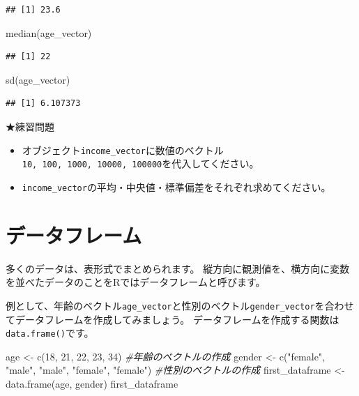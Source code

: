 \documentclass[
]{book}
\newenvironment{Shaded}{\begin{snugshade}}{\end{snugshade}}
\newcommand{\CommentTok}[1]{\textcolor[rgb]{0.56,0.35,0.01}{\textit{#1}}}
\newcommand{\DecValTok}[1]{\textcolor[rgb]{0.00,0.00,0.81}{#1}}
\newcommand{\FunctionTok}[1]{\textcolor[rgb]{0.00,0.00,0.00}{#1}}
\newcommand{\NormalTok}[1]{#1}
\newcommand{\OtherTok}[1]{\textcolor[rgb]{0.56,0.35,0.01}{#1}}
\newcommand{\StringTok}[1]{\textcolor[rgb]{0.31,0.60,0.02}{#1}}
\providecommand{\tightlist}{%
  \setlength{\itemsep}{0pt}\setlength{\parskip}{0pt}}
\begin{document}
\begin{verbatim}
## [1] 23.6
\end{verbatim}

\begin{Shaded}
\begin{Highlighting}[]
\FunctionTok{median}\NormalTok{(age\_vector)}
\end{Highlighting}
\end{Shaded}

\begin{verbatim}
## [1] 22
\end{verbatim}

\begin{Shaded}
\begin{Highlighting}[]
\FunctionTok{sd}\NormalTok{(age\_vector)}
\end{Highlighting}
\end{Shaded}

\begin{verbatim}
## [1] 6.107373
\end{verbatim}

★練習問題

\begin{itemize}
\tightlist
\item
  オブジェクト\texttt{income\_vector}に数値のベクトル\texttt{10,\ 100,\ 1000,\ 10000,\ 100000}を代入してください。
\item
  \texttt{income\_vector}の平均・中央値・標準偏差をそれぞれ求めてください。
\end{itemize}

\hypertarget{ux30c7ux30fcux30bfux30d5ux30ecux30fcux30e0}{%
\section{データフレーム}\label{ux30c7ux30fcux30bfux30d5ux30ecux30fcux30e0}}

多くのデータは、表形式でまとめられます。
縦方向に観測値を、横方向に変数を並べたデータのことをRではデータフレームと呼びます。

例として、年齢のベクトル\texttt{age\_vector}と性別のベクトル\texttt{gender\_vector}を合わせてデータフレームを作成してみましょう。
データフレームを作成する関数は\texttt{data.frame()}です。

\begin{Shaded}
\begin{Highlighting}[]
\NormalTok{age }\OtherTok{\textless{}{-}} \FunctionTok{c}\NormalTok{(}\DecValTok{18}\NormalTok{, }\DecValTok{21}\NormalTok{, }\DecValTok{22}\NormalTok{, }\DecValTok{23}\NormalTok{, }\DecValTok{34}\NormalTok{) }\CommentTok{\#年齢のベクトルの作成}
\NormalTok{gender }\OtherTok{\textless{}{-}} \FunctionTok{c}\NormalTok{(}\StringTok{"female"}\NormalTok{, }\StringTok{"male"}\NormalTok{, }\StringTok{"male"}\NormalTok{, }\StringTok{"female"}\NormalTok{, }\StringTok{"female"}\NormalTok{) }\CommentTok{\#性別のベクトルの作成}
\NormalTok{first\_dataframe }\OtherTok{\textless{}{-}} \FunctionTok{data.frame}\NormalTok{(age, gender)}
\NormalTok{first\_dataframe}
\end{Highlighting}
\end{Shaded}
\end{document}
